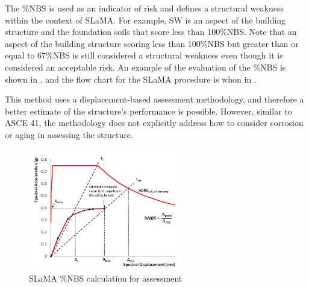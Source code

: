 The \%NBS is used as an indicator of risk and defines a structural weakness within the context of SLaMA. For example, SW is an aspect of the building structure and the foundation soils that score less than 100\%NBS. Note that an aspect of the building structure scoring less than 100\%NBS but greater than or equal to 67\%NBS is still considered a structural weakness even though it is considered an acceptable risk. An example of the evaluation of the \%NBS is shown in , and the flow chart for the SLaMA procedure is whon in .

This method uses a displacement-based assessment methodology, and therefore a better estimate of the structure's performance is possible. However, similar to ASCE 41, the methodology does not explicitly address how to consider corrosion or aging in assessing the structure.

\begin{figure}[htbp]
	\centering
	\includegraphics[width=0.60\textwidth]{VAC Thesis 2.0/Chapter-6/figs/nbs_example.jpg}
	\caption{SLaMA \%NBS calculation for assessment}
	\label{fig:nbs_CH6}
\end{figure}

